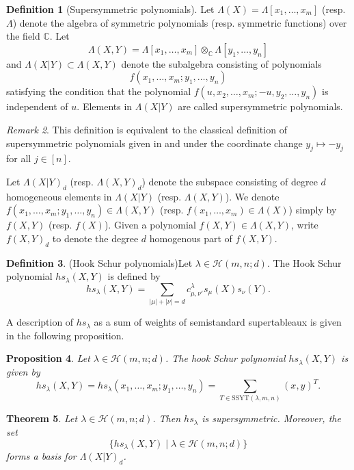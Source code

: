 \documentclass[12pt,reqno]{amsart}
\newtheorem{theorem}{Theorem}[section]
\newtheorem{proposition}[theorem]{Proposition}
\theoremstyle{definition}
\newtheorem{definition}[theorem]{Definition}
\theoremstyle{remark}
\newtheorem{remark}[theorem]{Remark}
\newcommand{\Hi}{\mathcal{H}(m,n;d)}
\begin{document}
\begin{definition}[Supersymmetric polynomials]\label{supersymmetricfunctions}
Let $\Lambda(X)=\Lambda[x_{1},\dotsc,x_{m}]$ (resp. $\Lambda$) denote the algebra of symmetric polynomials (resp. symmetric functions) over the field $\mathbb{C}$. Let $$\Lambda(X,Y)=\Lambda[x_{1},\dotsc,x_{m}]\otimes_{\mathbb{C}}\Lambda[y_{1},\dotsc,y_{n}]$$ and $\Lambda(X|Y)\subset \Lambda(X,Y)$ denote the subalgebra consisting of polynomials $$f(x_{1},\dotsc,x_{m};y_{1},\dotsc,y_{n})$$ satisfying the condition that the polynomial $f(u,x_{2},\dotsc,x_{m};-u,y_{2},\dotsc,y_{n})$ is independent of $u$. Elements in $\Lambda(X|Y)$ are called supersymmetric polynomials. \cite{stembridge1985characterization} %
\end{definition}

\begin{remark}
    This definition is equivalent to the classical definition of supersymmetric polynomials given in \cite{stembridge1985characterization} and \cite{macdonald1998symmetric} under the coordinate change $y_{j}\mapsto -y_{j}$ for all $j\in [n]$.
\end{remark}

Let $\Lambda(X|Y)_{d}$ (resp. $\Lambda(X,Y)_d$) denote the subspace consisting of degree $d$ homogeneous elements in $\Lambda(X|Y)$ (resp. $\Lambda(X,Y)$). We denote $f(x_{1},\dotsc,x_{m};y_{1},\dotsc,y_{n})\in \Lambda(X,Y)$ (resp. $f(x_{1},\dotsc,x_{m})\in\Lambda(X)$) simply by $f(X,Y)$ (resp. $f(X)$). Given a polynomial $f(X,Y)\in \Lambda(X,Y)$, write $f(X,Y)_{d}$ to denote the degree $d$ homogenous part of $f(X,Y)$.
\begin{definition}(Hook Schur polynomials)\cite[Definition 6.3]{berele1987hook}\label{hookSchurdef}     Let $\lambda\in\Hi$. The Hook Schur polynomial $hs_{\lambda}(X,Y)$ is defined by
$$hs_{\lambda}(X,Y)=\sum_{|\mu|+|\nu|=d}c^{\lambda}_{\mu,\nu'}s_{\mu}(X)s_{\nu}(Y).$$
\end{definition}

 A description of $hs_{\lambda}$ as a sum of weights of semistandard supertableaux is given in the following proposition.
\begin{proposition}\label{tableauxformula}{\em\cite[Theorem 6.10]{berele1987hook}}
    Let $\lambda\in\Hi$. The hook Schur polynomial $hs_{\lambda}(X,Y)$ is given by
    $$hs_{\lambda}(X,Y)=hs_{\lambda}(x_{1},\dotsc,x_{m};y_{1},\dotsc,y_{n})=\sum_{T\in \text{SSYT}(\lambda,m,n)}(x,y)^{T}.$$
\end{proposition}
\begin{theorem}{\em\cite[Chapter I.3, Example 24.(c)]{macdonald1998symmetric}}\label{hookSchurBasis}
    Let $\lambda\in\Hi$. Then $hs_{\lambda}$ is supersymmetric. Moreover, the set
    $$\{hs_{\lambda}(X,Y)\mid\lambda\in\Hi\}$$ forms a basis for $\Lambda(X|Y)_{d}$.
\end{theorem}
\end{document}

